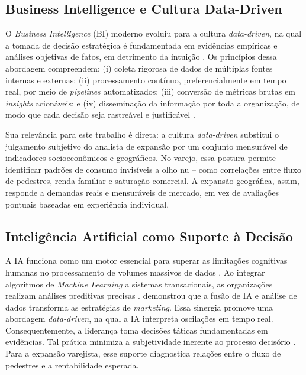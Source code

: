 \subsection{\esp Business Intelligence e Cultura Data-Driven} \label{subsec:bi_datadriven}
O \textit{Business Intelligence} (BI) moderno evoluiu para a cultura \textit{data-driven}, na qual a tomada de decisão estratégica é fundamentada em evidências empíricas e análises objetivas de fatos, em detrimento da intuição \cite{sharda2019}. Os princípios dessa abordagem compreendem: (i) coleta rigorosa de dados de múltiplas fontes internas e externas; (ii) processamento contínuo, preferencialmente em tempo real, por meio de \textit{pipelines} automatizados; (iii) conversão de métricas brutas em \textit{insights} acionáveis; e (iv) disseminação da informação por toda a organização, de modo que cada decisão seja rastreável e justificável \cite{barbieri2020}.

Sua relevância para este trabalho é direta: a cultura \textit{data-driven} substitui o julgamento subjetivo do analista de expansão por um conjunto mensurável de indicadores socioeconômicos e geográficos. No varejo, essa postura permite identificar padrões de consumo invisíveis a olho nu -- como correlações entre fluxo de pedestres, renda familiar e saturação comercial. A expansão geográfica, assim, responde a demandas reais e mensuráveis de mercado, em vez de avaliações pontuais baseadas em experiência individual.

\subsection{\esp Inteligência Artificial como Suporte à Decisão} \label{subsec:ia_decisao}
A IA funciona como um motor essencial para superar as limitações cognitivas humanas no processamento de volumes massivos de dados \cite{sharda2019}. Ao integrar algoritmos de \textit{Machine Learning} a sistemas transacionais, as organizações realizam análises preditivas precisas \cite{dahake2024, rajan2024}.  demonstrou que a fusão de IA e análise de dados transforma as estratégias de \textit{marketing}. Essa sinergia promove uma abordagem \textit{data-driven}, na qual a IA interpreta oscilações em tempo real. Consequentemente, a liderança toma decisões táticas fundamentadas em evidências. Tal prática minimiza a subjetividade inerente ao processo decisório \cite{rajan2024, peri2025}. Para a expansão varejista, esse suporte diagnostica relações entre o fluxo de pedestres e a rentabilidade esperada.
